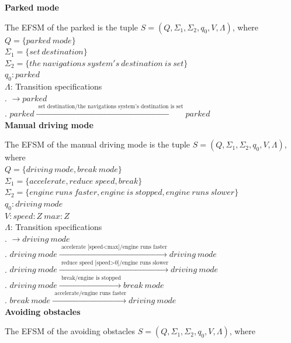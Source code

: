 \documentclass[12pt]{article}
\begin{document}
\begin{spacing}{1.5}
\newpage
\noindent \textbf{Parked mode}

\noindent The EFSM of the parked is the tuple $S = (Q, \Sigma_1, \Sigma_2, q_0, V, \Lambda)$, where\\

\noindent $Q = \{parked~mode\}$\\
\noindent $\Sigma_1 = \{set~destination\}$\\
\noindent $\Sigma_2 = \{the~navigations~system's~destination~is~set\}$\\
\noindent $q_0: parked$\\
\noindent $\Lambda$: Transition specifications\\
. $\rightarrow parked$\\
. $parked \xrightarrow {\text { set~destination/the~navigations~system's~destination~is~set}} parked$\\

\newpage
\noindent \textbf{Manual driving mode}

\noindent The EFSM of the manual driving mode is the tuple $S = (Q, \Sigma_1, \Sigma_2, q_0, V, \Lambda)$, where\\

\noindent $Q = \{driving~mode, break~mode\}$\\
\noindent $\Sigma_1 = \{accelerate,reduce~speed,break\}$\\
\noindent $\Sigma_2 = \{engine~runs~faster,engine~is~stopped,
engine~runs~slower\}$\\
\noindent $q_0: driving~mode$\\
\noindent $V: speed:Z~max:Z$\\
\noindent $\Lambda$: Transition specifications\\
. $\rightarrow driving~mode$\\
. $driving~mode \xrightarrow {\text { accelerate~[speed<max]/engine~runs~faster}} driving~mode$\\
. $driving~mode \xrightarrow {\text { reduce~speed~[speed>0]/engine~runs~slower}} driving~mode$\\
. $driving~mode \xrightarrow {\text { break/engine~is~stopped}} break~mode$\\
. $break~mode \xrightarrow {\text { accelerate/engine~runs~faster}} driving~mode$\\
\newpage
\noindent \textbf{Avoiding obstacles}

\noindent The EFSM of the avoiding obstacles $S = (Q, \Sigma_1, \Sigma_2, q_0, V, \Lambda)$, where\\


\end{spacing}
\end{document}
